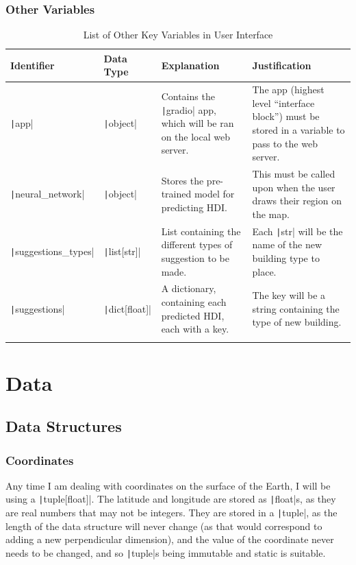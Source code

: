 \documentclass[12pt]{report}
\newcommand{\pil}[1]{\texttt|#1|}
\begin{document}
\subsubsection{Other Variables}
\begin{center}
\begin{longtable}{ | m{3cm} | m{4cm}| m{4cm} | m{4cm} |} 
    \hline
    \textbf{Identifier} & \textbf{Data Type} & \textbf{Explanation}  & \textbf{Justification} \\ 
    \hline
    \pil{app} & \pil{object} & Contains the \pil{gradio} app, which will be ran on the local web server. & The app (highest level ``interface block'') must be stored in a variable to pass to the web server. \\ 
    \hline
    \pil{neural_network} & \pil{object} & Stores the pre-trained model for predicting HDI. & This must be called upon when the user draws their region on the map. \\ 
    \hline
    \pil{suggestions_types} & \pil{list[str]} & List containing the different types of suggestion to be made. & Each \pil{str} will be the name of the new building type to place. \\ 
    \hline
    \pil{suggestions} & \pil{dict[float]} & A dictionary, containing each predicted HDI, each with a key. & The key will be a string containing the type of new building. \\ 
    \hline
\caption{List of Other Key Variables in User Interface}
\end{longtable}
\end{center}

\section{Data}
\subsection{Data Structures}
\subsubsection{Coordinates}
Any time I am dealing with coordinates on the surface of the Earth, I will be using a \pil{tuple[float]}. The latitude and longitude are stored as \pil{float}s, as they are real numbers that may not be integers. They are stored in a \pil{tuple}, as the length of the data structure will never change (as that would correspond to adding a new perpendicular dimension), and the value of the coordinate never needs to be changed, and so \pil{tuple}s being immutable and static is suitable.
\end{document}
